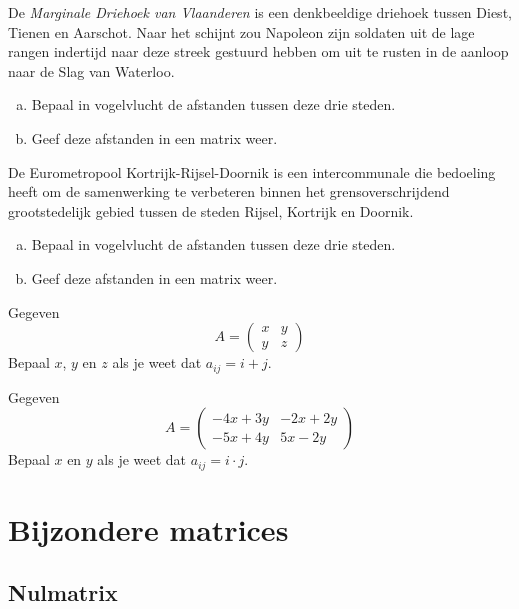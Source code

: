 \documentclass[12pt,twoside]{article}
\begin{document}
\begin{oefening}
De {\em Marginale Driehoek van Vlaanderen} is een denkbeeldige driehoek tussen Diest, Tienen en Aarschot. Naar het schijnt zou Napoleon zijn soldaten uit de lage rangen indertijd naar deze streek gestuurd hebben om uit te rusten in de aanloop naar de Slag van Waterloo.
\begin{enumerate}[(a)]
  \item Bepaal in vogelvlucht de afstanden tussen deze drie steden.
  \item Geef deze afstanden in een matrix weer.
\end{enumerate}
\end{oefening}

\begin{oefening}
De Eurometropool Kortrijk-Rijsel-Doornik is een intercommunale die bedoeling heeft om de samenwerking te verbeteren binnen het grensoverschrijdend grootstedelijk gebied tussen de steden Rijsel, Kortrijk en Doornik.
\begin{enumerate}[(a)]
  \item Bepaal in vogelvlucht de afstanden tussen deze drie steden.
  \item Geef deze afstanden in een matrix weer.
\end{enumerate}
\end{oefening}

\begin{oefening}
Gegeven
$$A=\begin{pmatrix}
  x & y\\
  y & z
\end{pmatrix}$$
Bepaal $x$, $y$ en $z$ als je weet dat $a_{ij}=i+j$.
\end{oefening}

\begin{oefening}
Gegeven
$$A=\begin{pmatrix}
  -4x+3y & -2x+2y\\
  -5x+4y & 5x-2y
\end{pmatrix}$$
Bepaal $x$ en $y$ als je weet dat $a_{ij}=i\cdot j$.
\end{oefening}


\pagebreak
\section{Bijzondere matrices}

\subsection{Nulmatrix}
\end{document}
